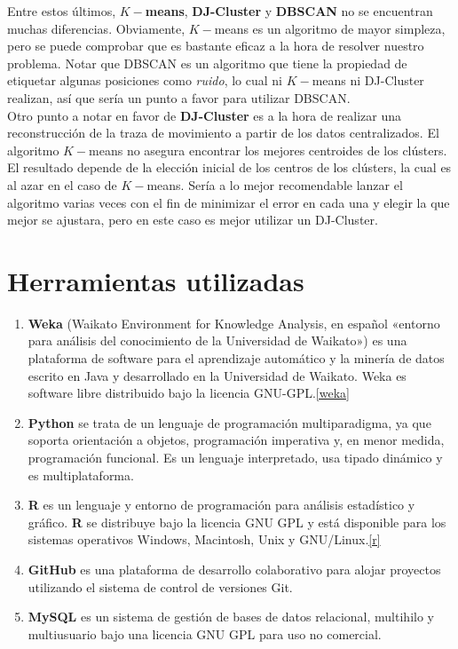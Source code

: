 \documentclass[a4paper, 12pt]{article}
\begin{document}
Entre estos \'ultimos, \textbf{$K-$means}, \textbf{DJ-Cluster} y \textbf{DBSCAN} no se encuentran muchas diferencias. Obviamente, $K-$means es un algoritmo de mayor simpleza, pero se puede comprobar que es bastante eficaz a la hora de resolver nuestro problema. Notar que DBSCAN es un algoritmo que tiene la propiedad de etiquetar algunas posiciones como \textit{ruido}, lo cual ni $K-$means ni DJ-Cluster realizan, as\'i que ser\'ia un punto a favor para utilizar DBSCAN.\\

Otro punto a notar en favor de \textbf{DJ-Cluster} es a la hora de realizar una reconstrucci\'on de la traza de movimiento a partir de los datos centralizados. El algoritmo $K-$means no asegura encontrar los mejores centroides de los cl\'usters. El resultado depende de la elecci\'on inicial de los centros de los cl\'usters, la cual es al azar en el caso de $K-$means. Ser\'ia a lo mejor recomendable lanzar el algoritmo varias veces con el fin de minimizar el error en cada una y elegir la que mejor se ajustara, pero en este caso es mejor utilizar un DJ-Cluster. 


\pagebreak
\section{Herramientas utilizadas}

\begin{enumerate}
	\item \textbf{Weka} (Waikato Environment for Knowledge Analysis, en espa\~nol «entorno para an\'alisis del conocimiento de la Universidad de Waikato») es una plataforma de software para el aprendizaje autom\'atico y la miner\'ia de datos escrito en Java y desarrollado en la Universidad de Waikato. Weka es software libre distribuido bajo la licencia GNU-GPL.\ref{weka}
	
	\item \textbf{Python} se trata de un lenguaje de programaci\'on multiparadigma, ya que soporta orientaci\'on a objetos, programaci\'on imperativa y, en menor medida, programaci\'on funcional. Es un lenguaje interpretado, usa tipado dinámico y es multiplataforma.
	
	\item \textbf{R} es un lenguaje y entorno de programaci\'on para an\'alisis estad\'istico y gr\'afico. \textbf{R} se distribuye bajo la licencia GNU GPL y est\'a disponible para los sistemas operativos Windows, Macintosh, Unix y GNU/Linux.\ref{r}
	
	\item \textbf{GitHub} es una plataforma de desarrollo colaborativo para alojar proyectos utilizando el sistema de control de versiones Git.
	
	\item \textbf{MySQL} es un sistema de gesti\'on de bases de datos relacional, multihilo y multiusuario bajo una licencia GNU GPL para uso no comercial.
	
\end{enumerate}
\end{document}
